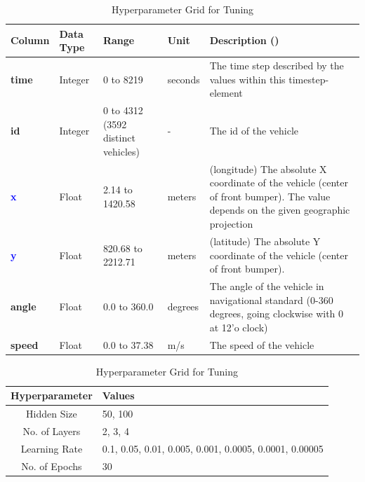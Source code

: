 \documentclass[journal,onecolumn]{IEEEtran}
\begin{document}
{\begin{table}[h!]
\centering
\begin{minipage}[t]{0.65\textwidth}
    \centering
    \scriptsize
    \caption{Dataset Features}
    \begin{tabular}{l|lp{1.8cm}lp{5.5cm}}
        Column & Data Type & Range & Unit & Description (\cite{dataset20kumbhar}) \\
        \hline
        \textbf{time} & Integer & 0 to 8219 & seconds & The time step described by the values within this timestep-element\\
        \textbf{id} & Integer & 0 to 4312 (3592 distinct vehicles) & - & The id of the vehicle\\
        \textcolor{blue}{\textbf{x}} & Float & 2.14 to 1420.58 & meters & (longitude) The absolute X coordinate of the vehicle (center of front bumper). The value depends on the given geographic projection \\
        \textcolor{blue}{\textbf{y}} & Float & 820.68 to 2212.71 & meters & (latitude) The absolute Y coordinate of the vehicle (center of front bumper). \\
        \textbf{angle} & Float & 0.0 to 360.0 & degrees & The angle of the vehicle in navigational standard (0-360 degrees, going clockwise with 0 at 12'o clock)\\
        \textbf{speed} & Float & 0.0 to 37.38 & m/s & The speed of the vehicle\\
    \end{tabular}
    \label{tab:features}
    \captionsetup{singlelinecheck=false, justification=raggedright}
    \caption*{\centering \footnotesize *The blue features are the subject of prediction for individual vehicles.}
    \vspace{-5mm}
\end{minipage}%
\hfill
\begin{minipage}[t]{0.32\textwidth}
    \centering
    \caption{Hyperparameter Grid for Tuning}
    \label{tab:tuning-values}
    \begin{tabular}{c|p{2.5cm}}
    \textbf{Hyperparameter} & \textbf{Values} \\
    \hline
    Hidden Size & 50, 100 \\
    No. of Layers & 2, 3, 4 \\
    Learning Rate & 0.1, 0.05, 0.01, 0.005, 0.001, 0.0005, 0.0001, 0.00005 \\
    No. of Epochs & 30 \\
    \end{tabular}
\end{minipage}
\end{table}
\clearpage

}
\end{document}
